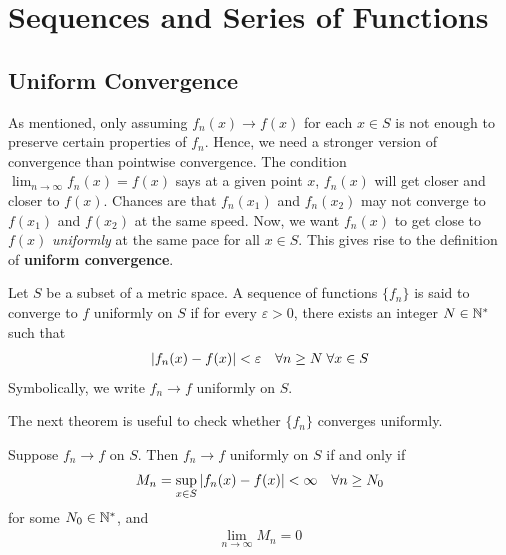 \documentclass[thmcnt=section, 12pt]{my-elegantbook}
\begin{document}

\chapter{Sequences and Series of Functions}


\section{Uniform Convergence}

As mentioned, only assuming $f_n(x) \to f(x)$ for each $x \in S$ is not enough to preserve certain properties of $f_n$. Hence, we need a stronger version of convergence than pointwise convergence. The condition $\lim_{n \to \infty} f_n(x) = f(x)$ says at a given point $x$, $f_n(x)$ will get closer and closer to $f(x)$. Chances are that $f_n(x_1)$ and $f_n(x_2)$ may not converge to $f(x_1)$ and $f(x_2)$ at the same speed. Now, we want $f_n(x)$ to get close to $f(x)$ \textit{uniformly} at the same pace for all $x \in S$. This gives rise to the definition of \textbf{uniform convergence}.

\begin{definition}
    Let $S$ be a subset of a metric space. A sequence of functions $\{f_n\}$ is said to converge to $f$ uniformly on $S$ if for every $\varepsilon > 0$, there exists an integer $N \in \mathbb{N}^\ast$ such that
    \begin{align*}
        \left\lvert f_n(x) - f(x) \right\rvert < \varepsilon
        \quad \forall n \geq N \;
        \forall x \in S
    \end{align*}
    Symbolically, we write $f_n \to f$ uniformly on $S$.
\end{definition}


The next theorem is useful to check whether $\{f_n\}$ converges uniformly.

\begin{theorem} \label{thm:46}
    Suppose $f_n \to f$ on $S$. Then $f_n \to f$ uniformly on $S$ if and only if
    \begin{align*}
        M_n = \sup_{x \in S} \left\lvert f_n(x) - f(x) \right\rvert < \infty
        \quad \forall n \geq N_0
    \end{align*}
    for some $N_0 \in \mathbb{N}^\ast$, and
    \begin{align*}
        \lim_{n \to \infty} M_n = 0
    \end{align*}
\end{theorem}
\end{document}
